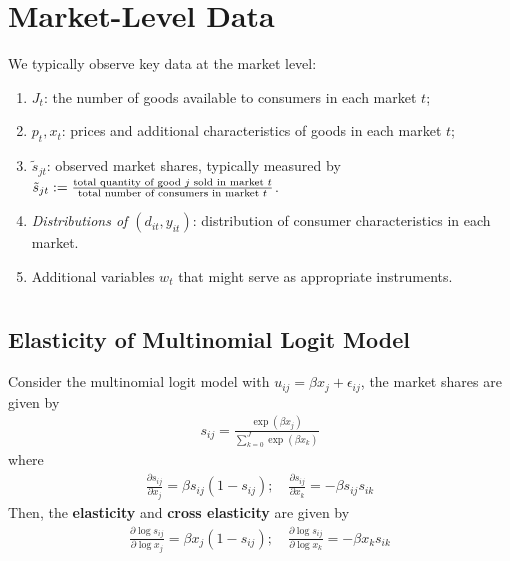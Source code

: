 \documentclass[11pt]{elegantbook}
\begin{document}
\section{Market-Level Data}
We typically observe key data at the market level:
\begin{enumerate}
    \item $J_t$: the number of goods available to consumers in each market $t$;
    \item $p_t,x_t$: prices and additional characteristics of goods in each market $t$;
    \item $\tilde{s}_{jt}$: observed market shares, typically measured by $\tilde{s}_{jt}:=\frac{\textnormal{total quantity of good $j$ sold in market $t$}}{\textnormal{total number of consumers in market $t$}}$.
    \item \textit{Distributions of $(d_{it},y_{it})$}: distribution of consumer characteristics in each market.
    \item Additional variables $w_t$ that might serve as appropriate instruments.
\end{enumerate}


\section{\cite{mcfadden1972conditional,mcfadden1981econometric}}
\subsection{Elasticity of Multinomial Logit Model}
Consider the multinomial logit model with $u_{ij}=\beta x_j+\epsilon_{ij}$, the market shares are given by
\begin{equation}
    \begin{aligned}
        s_{ij}=\frac{\exp\left(\beta x_j\right)}{\sum_{k=0}^{J}\exp\left(\beta x_k\right)}
    \end{aligned}
    \nonumber
\end{equation}
where
\begin{equation}
    \begin{aligned}
        \frac{\partial s_{ij}}{\partial x_j}%
        =\beta s_{ij}(1-s_{ij});\quad
        \frac{\partial s_{ij}}{\partial x_k}=-\beta s_{ij}s_{ik}
    \end{aligned}
    \nonumber
\end{equation}
Then, the \textbf{elasticity} and \textbf{cross elasticity} are given by
\begin{equation}
    \begin{aligned}
        \frac{\partial \log s_{ij}}{\partial \log x_j}=\beta x_j (1-s_{ij});\quad \frac{\partial \log s_{ij}}{\partial \log x_k}=-\beta x_k s_{ik}
    \end{aligned}
    \nonumber
\end{equation}
\end{document}
